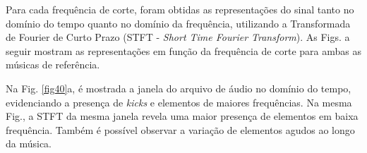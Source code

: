 Para cada frequência de corte, foram obtidas as representações do sinal tanto no domínio do tempo quanto no domínio da frequência, utilizando a Transformada de Fourier de Curto Prazo (STFT - \textit{Short Time Fourier Transform}). 
As Figs. a seguir mostram as representações em função da frequência de corte para ambas as músicas de referência.

Na Fig. \ref{fig40}a, é mostrada a janela do arquivo de áudio no domínio do tempo, evidenciando a presença de \textit{kicks} e elementos de maiores frequências. Na mesma Fig., a STFT da mesma janela revela uma maior presença de elementos em baixa frequência. Também é possível observar a variação de elementos agudos ao longo da música.

